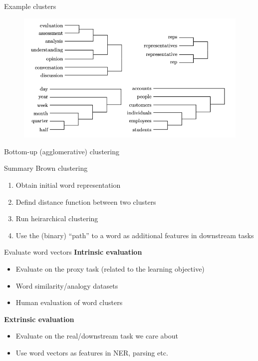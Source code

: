 \documentclass[usenames,dvipsnames,notes]{beamer}
\begin{document}
\begin{frame}
    {Example clusters}
    \begin{figure}
        \includegraphics[width=12cm]{figures/brown-clusters}
    \end{figure}
\end{frame}

\begin{frame}
    {Bottom-up (agglomerative) clustering}
\end{frame}

\begin{frame}
    {Summary}
    Brown clustering\\
    \begin{enumerate}
        \item Obtain initial word representation
        \item Defind distance function between two clusters
        \item Run heirarchical clustering
        \item Use the (binary) ``path'' to a word as additional features in downstream tasks
    \end{enumerate}
\end{frame}

\begin{frame}
    {Evaluate word vectors}
    \textbf{Intrinsic evaluation}\\
    \begin{itemize}
        \item Evaluate on the proxy task (related to the learning objective)
        \item Word similarity/analogy datasets
        \item Human evaluation of word clusters
    \end{itemize}

    \textbf{Extrinsic evaluation}\\
    \begin{itemize}
        \item Evaluate on the real/downstream task we care about
        \item Use word vectors as features in NER, parsing etc.
    \end{itemize}
\end{frame}
\end{document}
